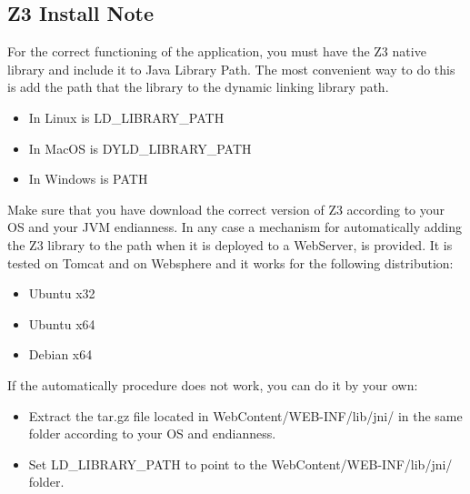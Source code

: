 \documentclass[a4paper,11pt]{article}
\begin{document}
\subsection{Z3 Install Note}
For the correct functioning of the application, you must have the Z3 native library and include it to Java Library Path.
The most convenient way to do this is add the path that the library to the dynamic linking library path.
\begin{itemize}
    \item In Linux is LD\_LIBRARY\_PATH
    \item In MacOS is DYLD\_LIBRARY\_PATH
    \item In Windows is PATH
\end{itemize}
Make sure that you have download the correct version of Z3 according to your OS and your JVM endianness.
In any case a mechanism for automatically adding the Z3 library to the path when it is deployed to a WebServer, is provided.
It is tested on Tomcat and on Websphere and it works for the following distribution:
\begin{itemize}
    \item Ubuntu x32
    \item Ubuntu x64
    \item Debian x64
\end{itemize}
If the automatically procedure does not work, you can do it by your own:
\begin{itemize}
    \item Extract the tar.gz file located in WebContent/WEB-INF/lib/jni/ in the same folder according to your OS and endianness.
    \item Set LD\_LIBRARY\_PATH to point to the WebContent/WEB-INF/lib/jni/ folder.
\end{itemize}
\newpage
\end{document}
